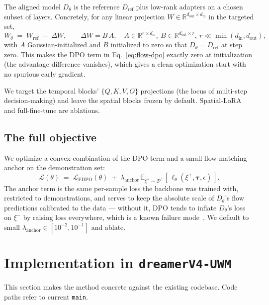 \documentclass[11pt]{article}
\newcommand{\Dtheta}{D_\theta}
\newcommand{\Dref}{D_{\mathrm{ref}}}
\newcommand{\Dpref}{\mathcal{D}^{+}}
\begin{document}
The aligned model $\Dtheta$ is the reference $\Dref$ plus low-rank adapters on a chosen subset of layers. Concretely, for any linear projection $W \in \mathbb{R}^{d_{\mathrm{out}} \times d_{\mathrm{in}}}$ in the targeted set,
\begin{equation}
    W_\theta \;=\; W_{\mathrm{ref}} \;+\; \Delta W, \qquad \Delta W = B\,A, \quad A \in \mathbb{R}^{r \times d_{\mathrm{in}}},\ B \in \mathbb{R}^{d_{\mathrm{out}} \times r},\ r \ll \min(d_{\mathrm{in}}, d_{\mathrm{out}}),
\end{equation}
with $A$ Gaussian-initialized and $B$ initialized to zero so that $\Dtheta = \Dref$ at step zero. This makes the DPO term in Eq.~\eqref{eq:flow-dpo} exactly zero at initialization (the advantage difference vanishes), which gives a clean optimization start with no spurious early gradient.

We target the temporal blocks' $\{Q, K, V, O\}$ projections (the locus of multi-step decision-making) and leave the spatial blocks frozen by default. Spatial-LoRA and full-fine-tune are ablations.

\subsection{The full objective}
\label{sec:objective}

We optimize a convex combination of the DPO term and a small flow-matching anchor on the demonstration set:
\begin{equation}
    \mathcal{L}(\theta) \;=\; \mathcal{L}_{\mathrm{FDPO}}(\theta) \;+\; \lambda_{\mathrm{anchor}}\, \mathbb{E}_{\xi^+ \sim \Dpref}\!\left[\, \ell_\theta(\xi^+, \boldsymbol{\tau}, \epsilon) \,\right].
    \label{eq:full-loss}
\end{equation}
The anchor term is the same per-sample loss the backbone was trained with, restricted to demonstrations, and serves to keep the absolute scale of $\Dtheta$'s flow predictions calibrated to the data --- without it, DPO tends to inflate $\Dtheta$'s loss on $\xi^-$ by raising loss everywhere, which is a known failure mode~\cite{azar2024general,xu2024contrastive}. We default to small $\lambda_{\mathrm{anchor}} \in [10^{-2}, 10^{-1}]$ and ablate.

\section{Implementation in \texttt{dreamerV4-UWM}}
\label{sec:implementation}

This section makes the method concrete against the existing codebase. Code paths refer to current \texttt{main}.
\end{document}
